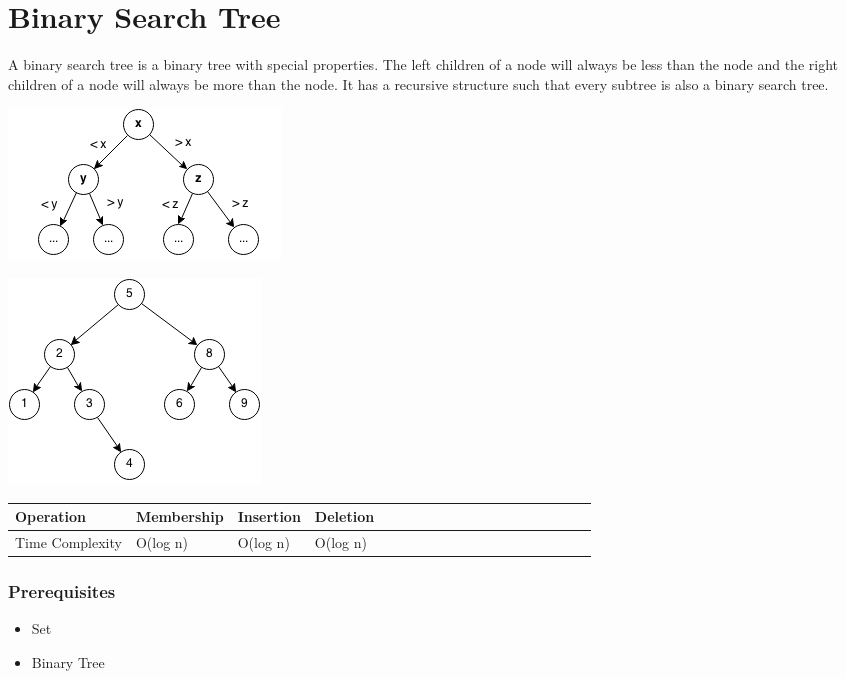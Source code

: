 \documentclass[11pt,oneside]{book}
\makeatletter
\def\maxwidth#1{\ifdim\Gin@nat@width>#1 #1\else\Gin@nat@width\fi}
\makeatother
\begin{document}
        \section{ Binary Search Tree }
        

A binary search tree is a  binary tree with special properties. The left children of a node will always be less than the node and the right children of a node will always be more than the node. It has a recursive structure such that every subtree is also a binary search tree.

\includegraphics[width=\maxwidth{\textwidth}]{bstcompare.png}

\includegraphics[width=\maxwidth{\textwidth}]{bst.png}

\vspace{10pt} \begin{tabulary}{0.4\linewidth}{|l|l|l|l|l|l|l|l|l|l|l|l|l|l|l|l|l|l|l}\hline


  Operation &
  Membership &
  Insertion &
  Deletion\\
\hline


  Time Complexity &
  O(log n) &
  O(log n) &
  O(log n)\\

\hline\end{tabulary}

\subsubsection{Prerequisites}

\begin{itemize}
\item Set
\item Binary Tree
\end{itemize}
\end{document}
